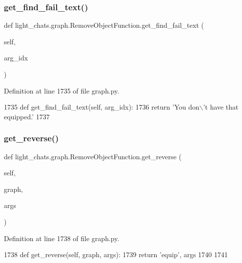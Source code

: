 \subsubsection{\texorpdfstring{get\+\_\+find\+\_\+fail\+\_\+text()}{get\_find\_fail\_text()}}
{\footnotesize\ttfamily def light\+\_\+chats.\+graph.\+Remove\+Object\+Function.\+get\+\_\+find\+\_\+fail\+\_\+text (\begin{DoxyParamCaption}\item[{}]{self,  }\item[{}]{arg\+\_\+idx }\end{DoxyParamCaption})}



Definition at line 1735 of file graph.\+py.


\begin{DoxyCode}
1735     \textcolor{keyword}{def }get\_find\_fail\_text(self, arg\_idx):
1736         \textcolor{keywordflow}{return} \textcolor{stringliteral}{'You don\(\backslash\)'t have that equipped.'}
1737 
\end{DoxyCode}
\mbox{\label{classlight__chats_1_1graph_1_1RemoveObjectFunction_a25e0182ea553e22cc861479aabd6a989}} 
\subsubsection{\texorpdfstring{get\+\_\+reverse()}{get\_reverse()}}
{\footnotesize\ttfamily def light\+\_\+chats.\+graph.\+Remove\+Object\+Function.\+get\+\_\+reverse (\begin{DoxyParamCaption}\item[{}]{self,  }\item[{}]{graph,  }\item[{}]{args }\end{DoxyParamCaption})}



Definition at line 1738 of file graph.\+py.


\begin{DoxyCode}
1738     \textcolor{keyword}{def }get\_reverse(self, graph, args):
1739         \textcolor{keywordflow}{return} \textcolor{stringliteral}{'equip'}, args
1740 
1741 
\end{DoxyCode}


